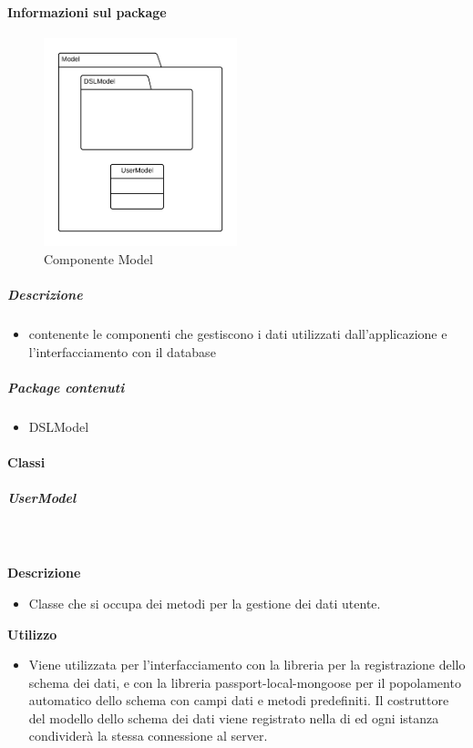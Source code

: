 	\paragraph{Informazioni sul package} 
		\begin{figure}[H] 
			\begin{center} 
				\includegraphics[width=0.5\textwidth]{uml/package/Back-end::Lib::Model.png}  
				\caption{Componente Model}
			\end{center}  
		\end{figure} 
	\subparagraph{Descrizione} 
		\begin{itemize}
		\item[]  contenente le componenti che gestiscono i dati utilizzati dall’applicazione e l’interfacciamento con il
database
		\end{itemize} 
		\subparagraph{Package contenuti} 
		\begin{itemize}
				\item DSLModel
		\end{itemize}
		\paragraph{Classi}
			\subparagraph{UserModel}
				
				\textbf{\\ \\ Descrizione} 
					\begin{itemize}
						\item[] Classe che si occupa dei metodi per la gestione dei dati utente. 
					\end{itemize}      
				\textbf{Utilizzo}  
					\begin{itemize}
						\item[] Viene utilizzata per l'interfacciamento con la libreria  per la registrazione dello schema dei dati, e con la libreria passport-local-mongoose per il popolamento automatico dello schema con campi dati e metodi predefiniti.
Il costruttore del modello dello schema dei dati viene registrato nella  di  ed ogni istanza condividerà la stessa connessione al server.
					\end{itemize}
